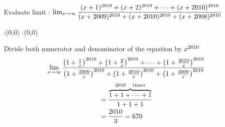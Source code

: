 



\question Evaluate limit : $\lim_{x\to \infty} \dfrac{(x+1)^{2010} + (x+2)^{2010}+ \cdots + (x+2010)^{2010}}{(x+2009)^{2010} + (x+2010)^{2010} + (x+2008)^{2010}} $ 


\watchout

\ifprintanswers
  \begin{marginfigure}
      :(0,0)
      :(0,0)
    \figdrawbegin{}
      \figdrawline [100,101]
    \figdrawend
    \figvisu{\figBoxA}{}{%
    }
    \centerline{\box\figBoxA}
  \end{marginfigure}
\fi 

\begin{solution}
Divide both numerator and denominator of the equation by $x^{2010}$ \\
\begin{align}
\lim_{x\to \infty} \dfrac{\left(1 + \frac{1}{x}\right)^{2010} + \left(1 + \frac{2}{x}\right)^{2010} + \cdots + \left(1 + \frac{2010}{x}\right)^{2010}}{\left(1 + \frac{2009}{x}\right)^{2010} + \left(1 + \frac{2010}{x}\right)^{2010} + \left(1 + \frac{2008}{x}\right)^{2010}} 
\end{align} 
\begin{align}
&=  \dfrac{\overbrace{1 + 1 + \cdots + 1}^{2010 \quad  \text{times}}}{1 + 1 + 1} \\
&= \dfrac{2010}{3} = 670 
\end{align}
\end{solution}



